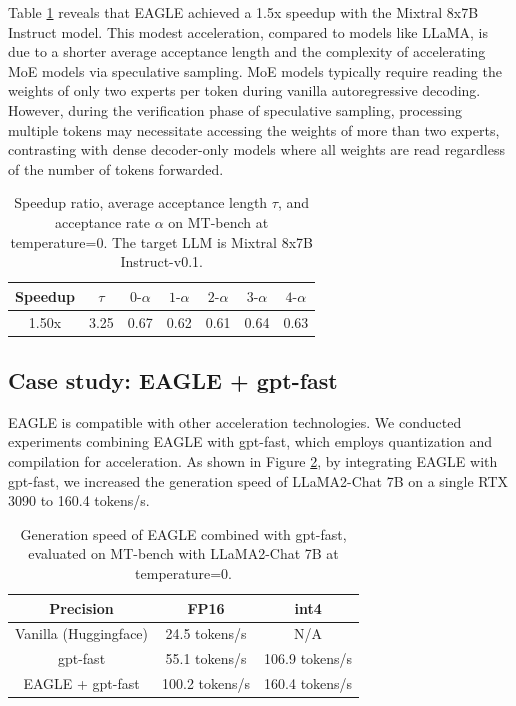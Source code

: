 \documentclass{article}
\theoremstyle{plain}
\theoremstyle{definition}
\theoremstyle{remark}
\begin{document}
Table \ref{tab:mix} reveals that EAGLE achieved a 1.5x speedup with the Mixtral 8x7B Instruct model. This modest acceleration, compared to models like LLaMA, is due to a shorter average acceptance length and the complexity of accelerating MoE models via speculative sampling. MoE models typically require reading the weights of only two experts per token during vanilla autoregressive decoding. However, during the verification phase of speculative sampling, processing multiple tokens may necessitate accessing the weights of more than two experts, contrasting with dense decoder-only models where all weights are read regardless of the number of tokens forwarded.
\begin{table}
  \centering
  \caption{Speedup ratio, average acceptance length $\tau$, and acceptance rate $\alpha$ on MT-bench at temperature=0. The target LLM is Mixtral 8x7B Instruct-v0.1.}
    \begin{tabular}{ccccccc}
    \toprule
    Speedup & $\tau$   & $0\text{-}\alpha$    & $1\text{-}\alpha$    & $2\text{-}\alpha$    & $3\text{-}\alpha$    & $4\text{-}\alpha$ \\
    \midrule
    1.50x & 3.25  & 0.67  & 0.62  & 0.61  & 0.64  & 0.63 \\
    \bottomrule
    \end{tabular}%
  \label{tab:mix}%
\end{table}%
\subsection{Case study: EAGLE + gpt-fast}
EAGLE is compatible with other acceleration technologies. We conducted experiments combining EAGLE with gpt-fast, which employs quantization and compilation for acceleration. As shown in Figure \ref{tab:gptfast}, by integrating EAGLE with gpt-fast, we increased the generation speed of LLaMA2-Chat 7B on a single RTX 3090 to 160.4 tokens/s.

\begin{table}
  \centering
  \caption{Generation speed of EAGLE combined with gpt-fast, evaluated on MT-bench with LLaMA2-Chat 7B at temperature=0.}
    \begin{tabular}{ccc}
    \toprule
    Precision & FP16  & int4 \\
    \midrule
    Vanilla (Huggingface) & 24.5 tokens/s & N/A \\
    gpt-fast & 55.1 tokens/s & 106.9 tokens/s \\
    EAGLE + gpt-fast & 100.2 tokens/s & 160.4 tokens/s \\
    \bottomrule
    \end{tabular}%
  \label{tab:gptfast}%
\end{table}%
\end{document}
